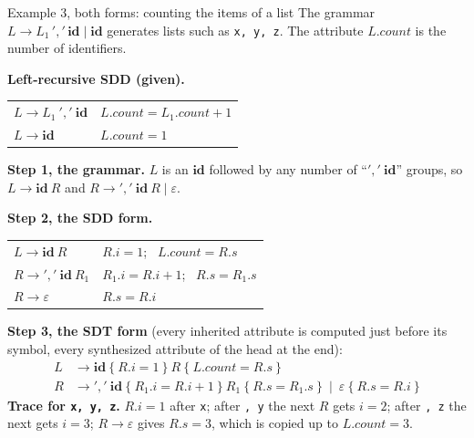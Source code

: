 \documentclass[11pt,a4paper]{article}
\newcommand{\at}[2]{\ensuremath{#1.\mathit{#2}}}
\newcommand{\tok}[1]{\ensuremath{\mathtt{#1}}}
\begin{document}
\begin{examplebox}{Example 3, both forms: counting the items of a list}
The grammar $L\to L_1\,\tok{','}\,\mathbf{id}\mid\mathbf{id}$ generates lists such as \texttt{x, y, z}. The attribute $\at{L}{count}$ is the number of identifiers.

\textbf{Left-recursive SDD (given).}
\begin{center}
\small
\begin{tabular}{@{}l l@{}}
\toprule
$L \to L_1\ \tok{','}\ \mathbf{id}$ & $\at{L}{count}=\at{L_1}{count}+1$ \\
$L \to \mathbf{id}$ & $\at{L}{count}=1$ \\ \bottomrule
\end{tabular}
\end{center}
\textbf{Step 1, the grammar.} $L$ is an $\mathbf{id}$ followed by any number of ``$\tok{','}\ \mathbf{id}$'' groups, so $L\to\mathbf{id}\ R$ and $R\to\tok{','}\ \mathbf{id}\ R\mid\varepsilon$.

\textbf{Step 2, the SDD form.}
\begin{center}
\small
\begin{tabular}{@{}l l@{}}
\toprule
$L \to \mathbf{id}\ R$ & $\at{R}{i}=1$; \ $\at{L}{count}=\at{R}{s}$ \\
$R \to \tok{','}\ \mathbf{id}\ R_1$ & $\at{R_1}{i}=\at{R}{i}+1$; \ $\at{R}{s}=\at{R_1}{s}$ \\
$R \to \varepsilon$ & $\at{R}{s}=\at{R}{i}$ \\ \bottomrule
\end{tabular}
\end{center}
\textbf{Step 3, the SDT form} (every inherited attribute is computed just before its symbol, every synthesized attribute of the head at the end):
\begin{align*}
L &\to \mathbf{id}\ \{\ \at{R}{i}=1\ \}\ R\ \{\ \at{L}{count}=\at{R}{s}\ \}\\
R &\to \tok{','}\ \mathbf{id}\ \{\ \at{R_1}{i}=\at{R}{i}+1\ \}\ R_1\ \{\ \at{R}{s}=\at{R_1}{s}\ \}\ \mid\ \varepsilon\ \{\ \at{R}{s}=\at{R}{i}\ \}
\end{align*}
\textbf{Trace for \texttt{x, y, z}.} $R.i=1$ after \texttt{x}; after \texttt{, y} the next $R$ gets $i=2$; after \texttt{, z} the next gets $i=3$; $R\to\varepsilon$ gives $R.s=3$, which is copied up to $L.count=3$.
\end{examplebox}
\end{document}

